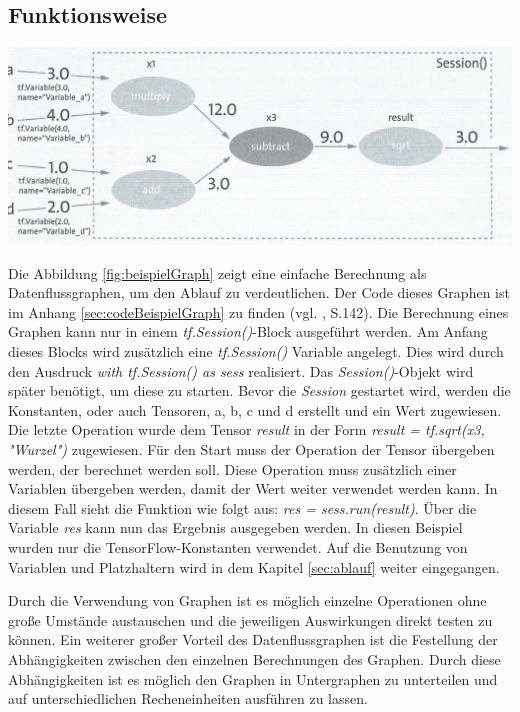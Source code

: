 \subsection{Funktionsweise}
\label{sec:graphenFunktionsweise}
\begin{center}
\includegraphics[width=.6\textwidth]{../abbildungen/5-11.pdf}
	\label{fig:beispielGraph}
\end{center}
Die Abbildung \ref{fig:beispielGraph} zeigt eine einfache Berechnung als Datenflussgraphen, um den Ablauf zu verdeutlichen. Der Code dieses Graphen ist im Anhang \ref{sec:codeBeispielGraph} zu finden (vgl. \citep{DeepLearning}, S.142). Die Berechnung eines Graphen kann nur in einem \textit{tf.Session()}-Block ausgeführt werden. Am Anfang dieses Blocks wird zusätzlich eine \textit{tf.Session()} Variable angelegt. Dies wird durch den Ausdruck \textit{with tf.Session() as sess} realisiert. Das \textit{Session()}-Objekt wird später benötigt, um diese zu starten. Bevor die \textit{Session} gestartet wird, werden die Konstanten, oder auch Tensoren, a, b, c und d erstellt und ein Wert zugewiesen. Die letzte Operation wurde dem Tensor \textit{result} in der Form \textit{result = tf.sqrt(x3, "Wurzel")} zugewiesen. Für den Start muss der Operation der Tensor übergeben werden, der berechnet werden soll. Diese Operation muss zusätzlich einer Variablen übergeben werden, damit der Wert weiter verwendet werden kann. In diesem Fall sieht die Funktion wie folgt aus: \textit{res = sess.run(result)}. Über die Variable \textit{res} kann nun das Ergebnis ausgegeben werden. In diesen Beispiel wurden nur die TensorFlow-Konstanten verwendet. Auf die Benutzung von Variablen und Platzhaltern wird in dem Kapitel \ref{sec:ablauf} weiter eingegangen.

Durch die Verwendung von Graphen ist es möglich einzelne Operationen ohne große Umstände austauschen  und die jeweiligen Auswirkungen direkt testen zu können. Ein weiterer großer Vorteil des Datenflussgraphen ist die Festellung der Abhängigkeiten zwischen den einzelnen Berechnungen des Graphen. Durch diese Abhängigkeiten ist es möglich den Graphen in Untergraphen zu unterteilen und auf unterschiedlichen Recheneinheiten ausführen zu lassen. 

